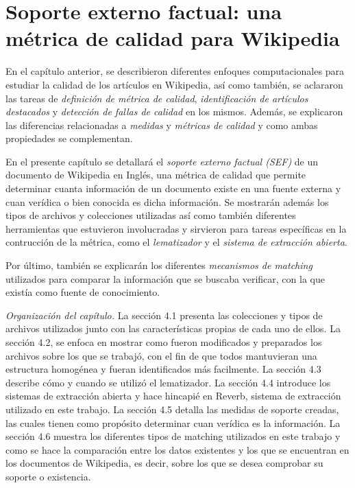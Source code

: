 \chapter{Soporte externo factual: una m\'etrica de calidad para Wikipedia}

En el cap\'itulo anterior, se describieron diferentes enfoques computacionales para estudiar la calidad de los art\'iculos en Wikipedia, as\'i como tambi\'en, se aclararon las tareas de \emph{definici\'on de m\'etrica de calidad}, \emph{identificaci\'on de art\'iculos destacados} y \emph{detecci\'on de fallas de calidad} en los mismos. Adem\'as, se explicaron las diferencias relacionadas a \emph{medidas} y \emph{m\'etricas de calidad} y como ambas propiedades se complementan.

En el presente cap\'itulo se detallar\'a el \emph{soporte externo factual (SEF)} de un documento de Wikipedia en Ingl\'es, una m\'etrica de calidad que permite determinar cuanta informaci\'on de un documento existe en una fuente externa y cuan ver\'idica o bien conocida es dicha informaci\'on. Se mostrar\'an adem\'as los tipos de archivos y colecciones utilizadas as\'i como tambi\'en diferentes herramientas que estuvieron involucradas y sirvieron para tareas espec\'ificas en la contrucci\'on de la m\'etrica, como el \emph{lematizador} y el \emph{sistema de extracci\'on abierta}.

Por \'ultimo, tambi\'en se explicar\'an los diferentes \emph{mecanismos de matching} utilizados para comparar la informaci\'on que se buscaba verificar, con la que exist\'ia como fuente de conocimiento.

\emph{Organizaci\'on del cap\'itulo.} La secci\'on 4.1 presenta las colecciones y tipos de archivos utilizados junto con las caracter\'isticas propias de cada uno de ellos. La secci\'on 4.2, se enfoca en mostrar como fueron modificados y preparados los archivos sobre los que se trabaj\'o, con el fin de que todos mantuvieran una estructura homog\'enea y fueran identificados m\'as facilmente. La secci\'on 4.3 describe c\'omo y cuando se utiliz\'o el lematizador. La secci\'on 4.4 introduce los sistemas de extracci\'on abierta y hace hincapi\'e en Reverb, sistema de extracci\'on utilizado en este trabajo. La secci\'on 4.5 detalla las medidas de soporte creadas, las cuales tienen como prop\'osito determinar cuan ver\'idica es la informaci\'on. La secci\'on 4.6 muestra los diferentes tipos de matching utilizados en este trabajo y como se hace la comparaci\'on entre los datos existentes y los que se encuentran en los documentos de Wikipedia, es decir, sobre los que se desea comprobar su soporte o existencia.

